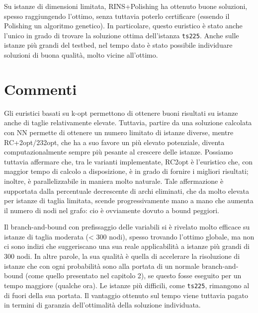 Su istanze di dimensioni limitata, RINS+Polishing ha ottenuto buone soluzioni, spesso raggiungendo l’ottimo, senza tuttavia poterlo certificare (essendo il Polishing un algoritmo genetico). In particolare, questo euristico è stato anche l’unico in grado di trovare la soluzione ottima dell’istanza \texttt{ts225}. Anche sulle istanze più grandi del testbed, nel tempo dato è stato possibile individuare soluzioni di buona qualità, molto vicine all’ottimo.

\section{Commenti}
Gli euristici basati su k-opt permettono di ottenere buoni risultati su istanze anche di taglie relativamente elevate. Tuttavia, partire da una soluzione calcolata con NN permette di ottenere un numero limitato di istanze diverse, mentre RC+2opt/232opt, che ha a suo favore un più elevato potenziale, diventa computazionalmente sempre più pesante al crescere delle istanze. Possiamo tuttavia affermare che, tra le varianti implementate, RC2opt è l’euristico che, con maggior tempo di calcolo a disposizione, è in grado di fornire i migliori risultati; inoltre, è parallelizzabile in maniera molto naturale. Tale affermazione è supportata dalla percentuale decrescente di archi eliminati, che da molto elevata per istanze di taglia limitata, scende progressivamente mano a mano che aumenta il numero di nodi nel grafo: cio è ovviamente dovuto a bound peggiori.

Il branch-and-bound con prefissaggio delle variabili si è rivelato molto efficace su istanze di taglia moderata (< 300 nodi), spesso trovando l’ottimo globale, ma non ci sono indizi che suggeriscano una sua reale applicabilità a istanze più grandi di 300 nodi. In altre parole, la sua qualità è quella di accelerare la risoluzione di istanze che con ogni probabilità sono alla portata di un normale branch-and-bound (come quello presentato nel capitolo 2), se questo fosse eseguito per un tempo maggiore (qualche ora). Le istanze più difficili, come \texttt{ts225}, rimangono al di fuori della sua portata. Il vantaggio ottenuto sul tempo viene tuttavia pagato in termini di garanzia dell’ottimalità della soluzione individuata.


